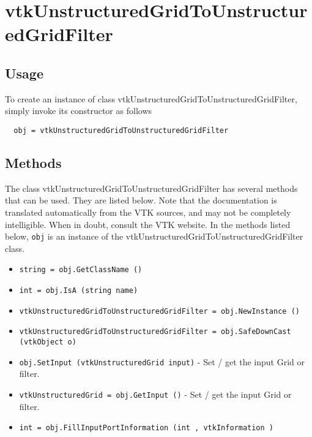 \section{vtkUnstructuredGridToUnstructuredGridFilter}

\subsection{Usage}


To create an instance of class vtkUnstructuredGridToUnstructuredGridFilter, simply
invoke its constructor as follows
\begin{verbatim}
  obj = vtkUnstructuredGridToUnstructuredGridFilter
\end{verbatim}
\subsection{Methods}

The class vtkUnstructuredGridToUnstructuredGridFilter has several methods that can be used.
  They are listed below.
Note that the documentation is translated automatically from the VTK sources,
and may not be completely intelligible.  When in doubt, consult the VTK website.
In the methods listed below, \verb|obj| is an instance of the vtkUnstructuredGridToUnstructuredGridFilter class.
\begin{itemize}
\item  \verb|string = obj.GetClassName ()|

\item  \verb|int = obj.IsA (string name)|

\item  \verb|vtkUnstructuredGridToUnstructuredGridFilter = obj.NewInstance ()|

\item  \verb|vtkUnstructuredGridToUnstructuredGridFilter = obj.SafeDownCast (vtkObject o)|

\item  \verb|obj.SetInput (vtkUnstructuredGrid input)| -  Set / get the input Grid or filter.

\item  \verb|vtkUnstructuredGrid = obj.GetInput ()| -  Set / get the input Grid or filter.

\item  \verb|int = obj.FillInputPortInformation (int , vtkInformation )|

\end{itemize}
